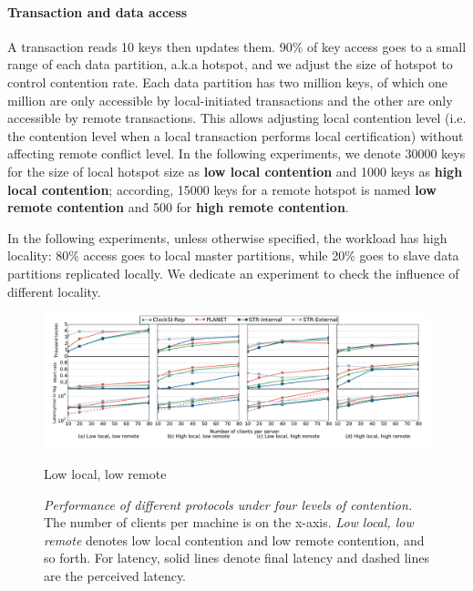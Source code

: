\paragraph{Transaction and data access} A transaction reads 10 keys then updates them. 90\% of key access goes to a small range of each data partition, a.k.a hotspot, and we adjust the size of hotspot to control contention rate. Each data partition has two million keys, of which one million are only accessible by local-initiated transactions and the other are only accessible by remote transactions. This allows adjusting local contention level (i.e. the contention level when a local transaction performs local certification) without affecting remote conflict level. In the following experiments, we denote 30000 keys for the size of local hotspot size as \textbf{low local contention} and 1000 keys as \textbf{high local contention}; according, 15000 keys for a remote hotspot is named \textbf{low remote contention} and 500 for \textbf{high remote contention}.

In the following experiments, unless otherwise specified, the workload has high locality: 80\% access goes to local master partitions, while 20\% goes to slave data partitions replicated locally. We dedicate an experiment to check the influence of different locality.

\begin{figure}
\centering
\def\svgwidth{0.98\columnwidth}
\includegraphics[scale=0.35]{figures/micro}
\caption{\footnotesize Low local, low remote}
\label{fig:conflict:a}
\label{fig:conflict:b}
\label{fig:conflict:c}
\label{fig:conflict:d}
\hspace{-10mm}
\caption{\textit{Performance of different protocols under four levels of contention.} The number of clients per machine is on the x-axis. \textit{Low local, low remote} denotes low local contention and low remote contention, and so forth. For latency, solid lines denote final latency and dashed lines are the perceived latency.}
\label{fig:micro_conflict}
\end{figure}


